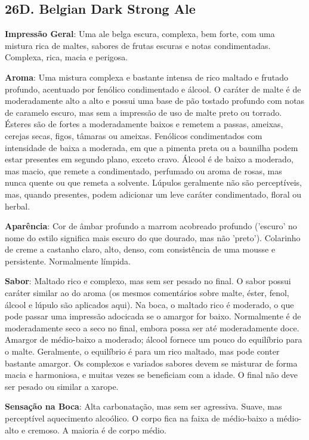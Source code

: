 \subsection*{26D. Belgian Dark Strong Ale}
\textbf{Impressão Geral}: Uma ale belga escura, complexa, bem forte, com uma mistura rica de maltes, sabores de frutas escuras e notas condimentadas. Complexa, rica, macia e perigosa.

\textbf{Aroma}: Uma mistura complexa e bastante intensa de rico maltado e frutado profundo, acentuado por fenólico condimentado e álcool. O caráter de malte é de moderadamente alto a alto e possui uma base de pão tostado profundo com notas de caramelo escuro, mas sem a impressão de uso de malte preto ou torrado. Ésteres são de fortes a moderadamente baixos e remetem a passas, ameixas, cerejas secas, figos, tâmaras ou ameixas. Fenólicos condimentados com intensidade de baixa a moderada, em que a pimenta preta ou a baunilha podem estar presentes em segundo plano, exceto cravo. Álcool é de baixo a moderado, mas macio, que remete a condimentado, perfumado ou aroma de rosas, mas nunca quente ou que remeta a solvente. Lúpulos geralmente não são perceptíveis, mas, quando presentes, podem adicionar um leve caráter condimentado, floral ou herbal.

\textbf{Aparência}: Cor de âmbar profundo a marrom acobreado profundo ('escuro' no nome do estilo significa mais escuro do que dourado, mas não 'preto'). Colarinho de creme a castanho claro, alto, denso, com consistência de uma mousse e persistente. Normalmente límpida.

\textbf{Sabor}: Maltado rico e complexo, mas sem ser pesado no final. O sabor possui caráter similar ao do aroma (os mesmos comentários sobre malte, éster, fenol, álcool e lúpulo são aplicados aqui). Na boca, o maltado rico é moderado, o que pode passar uma impressão adocicada se o amargor for baixo. Normalmente é de moderadamente seco a seco no final, embora possa ser até moderadamente doce. Amargor de médio-baixo a moderado; álcool fornece um pouco do equilíbrio para o malte. Geralmente, o equilíbrio é para um rico maltado, mas pode conter bastante amargor. Os complexos e variados sabores devem se misturar de forma macia e harmoniosa, e muitas vezes se beneficiam com a idade. O final não deve ser pesado ou similar a xarope.

\textbf{Sensação na Boca}: Alta carbonatação, mas sem ser agressiva. Suave, mas perceptível aquecimento alcoólico. O corpo fica na faixa de médio-baixo a médio-alto e cremoso. A maioria é de corpo médio.

